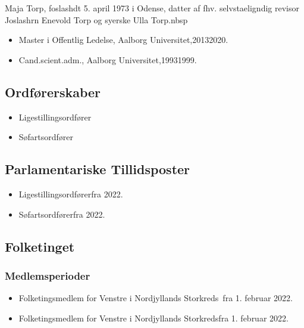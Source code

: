 \documentclass[11pt, a4paper]{awesome-cv}
\begin{document}
\makecvheader[R]
\makelettertitle
\begin{cvletter}
Maja Torp, foslashdt 5. april 1973 i Odense, datter af fhv. selvstaeligndig revisor Joslashrn Enevold Torp og syerske Ulla Torp.nbsp

\begin{itemize}
\item Master i Offentlig Ledelse, Aalborg Universitet,20132020.
\item Cand.scient.adm., Aalborg Universitet,19931999.
\end{itemize}
\subsection*{Ordførerskaber}
\begin{itemize}
\item Ligestillingsordfører
\item Søfartsordfører
\end{itemize}
\subsection*{Parlamentariske Tillidsposter}
\begin{itemize}
\item Ligestillingsordførerfra 2022.
\item Søfartsordførerfra 2022.
\end{itemize}
\subsection*{Folketinget}
\subsubsection*{Medlemsperioder}
\begin{itemize}
\item Folketingsmedlem for Venstre i Nordjyllands Storkreds fra 1. februar 2022.
\item Folketingsmedlem for Venstre i Nordjyllands Storkredsfra 1. februar 2022.
\end{itemize}

\end{cvletter}
\end{document}
